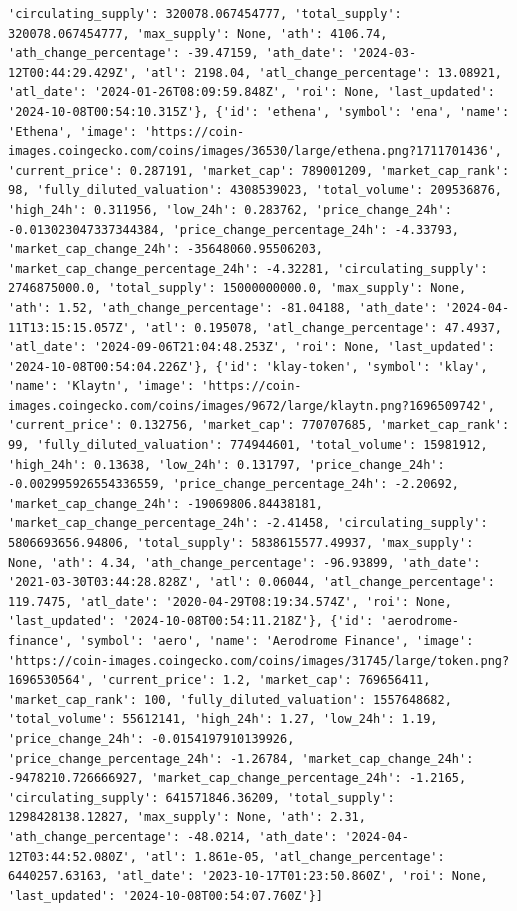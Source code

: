 \documentclass[
  letterpaper,
  DIV=11,
  numbers=noendperiod]{scrreprt}
\begin{document}
\begin{verbatim}
'circulating_supply': 320078.067454777, 'total_supply': 320078.067454777, 'max_supply': None, 'ath': 4106.74, 'ath_change_percentage': -39.47159, 'ath_date': '2024-03-12T00:44:29.429Z', 'atl': 2198.04, 'atl_change_percentage': 13.08921, 'atl_date': '2024-01-26T08:09:59.848Z', 'roi': None, 'last_updated': '2024-10-08T00:54:10.315Z'}, {'id': 'ethena', 'symbol': 'ena', 'name': 'Ethena', 'image': 'https://coin-images.coingecko.com/coins/images/36530/large/ethena.png?1711701436', 'current_price': 0.287191, 'market_cap': 789001209, 'market_cap_rank': 98, 'fully_diluted_valuation': 4308539023, 'total_volume': 209536876, 'high_24h': 0.311956, 'low_24h': 0.283762, 'price_change_24h': -0.013023047337344384, 'price_change_percentage_24h': -4.33793, 'market_cap_change_24h': -35648060.95506203, 'market_cap_change_percentage_24h': -4.32281, 'circulating_supply': 2746875000.0, 'total_supply': 15000000000.0, 'max_supply': None, 'ath': 1.52, 'ath_change_percentage': -81.04188, 'ath_date': '2024-04-11T13:15:15.057Z', 'atl': 0.195078, 'atl_change_percentage': 47.4937, 'atl_date': '2024-09-06T21:04:48.253Z', 'roi': None, 'last_updated': '2024-10-08T00:54:04.226Z'}, {'id': 'klay-token', 'symbol': 'klay', 'name': 'Klaytn', 'image': 'https://coin-images.coingecko.com/coins/images/9672/large/klaytn.png?1696509742', 'current_price': 0.132756, 'market_cap': 770707685, 'market_cap_rank': 99, 'fully_diluted_valuation': 774944601, 'total_volume': 15981912, 'high_24h': 0.13638, 'low_24h': 0.131797, 'price_change_24h': -0.002995926554336559, 'price_change_percentage_24h': -2.20692, 'market_cap_change_24h': -19069806.84438181, 'market_cap_change_percentage_24h': -2.41458, 'circulating_supply': 5806693656.94806, 'total_supply': 5838615577.49937, 'max_supply': None, 'ath': 4.34, 'ath_change_percentage': -96.93899, 'ath_date': '2021-03-30T03:44:28.828Z', 'atl': 0.06044, 'atl_change_percentage': 119.7475, 'atl_date': '2020-04-29T08:19:34.574Z', 'roi': None, 'last_updated': '2024-10-08T00:54:11.218Z'}, {'id': 'aerodrome-finance', 'symbol': 'aero', 'name': 'Aerodrome Finance', 'image': 'https://coin-images.coingecko.com/coins/images/31745/large/token.png?1696530564', 'current_price': 1.2, 'market_cap': 769656411, 'market_cap_rank': 100, 'fully_diluted_valuation': 1557648682, 'total_volume': 55612141, 'high_24h': 1.27, 'low_24h': 1.19, 'price_change_24h': -0.0154197910139926, 'price_change_percentage_24h': -1.26784, 'market_cap_change_24h': -9478210.726666927, 'market_cap_change_percentage_24h': -1.2165, 'circulating_supply': 641571846.36209, 'total_supply': 1298428138.12827, 'max_supply': None, 'ath': 2.31, 'ath_change_percentage': -48.0214, 'ath_date': '2024-04-12T03:44:52.080Z', 'atl': 1.861e-05, 'atl_change_percentage': 6440257.63163, 'atl_date': '2023-10-17T01:23:50.860Z', 'roi': None, 'last_updated': '2024-10-08T00:54:07.760Z'}]
\end{verbatim}
\end{document}

